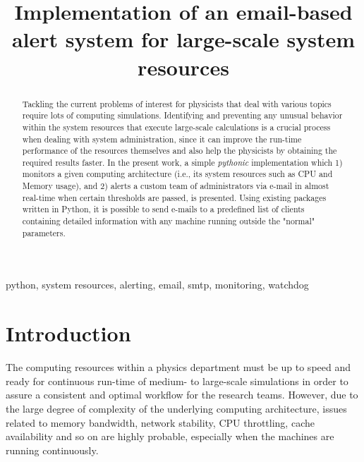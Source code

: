 \documentclass[conference]{IEEEtran}
\begin{document}
\title{Implementation of an email-based alert system for large-scale system resources}

\author{
}

\maketitle

\begin{abstract}
Tackling the current problems of interest for physicists that deal with various topics require lots of computing simulations. Identifying and preventing any unusual behavior within the system resources that execute large-scale calculations is a crucial process when dealing with system administration, since it can improve the run-time performance of the resources themselves and also help the physicists by obtaining the required results faster. In the present work, a simple \emph{pythonic} implementation which 1) monitors a given computing architecture (i.e., its system resources such as CPU and Memory usage), and 2) alerts a custom team of administrators via e-mail in almost real-time when certain thresholds are passed, is presented. Using existing packages written in Python, it is possible to send e-mails to a predefined list of clients containing detailed information with any machine running outside the "normal" parameters.
\end{abstract}

\begin{IEEEkeywords}
python, system resources, alerting, email, smtp, monitoring, watchdog
\end{IEEEkeywords}

\section{Introduction}
The computing resources within a physics department must be up to speed and ready for continuous run-time of medium- to large-scale simulations in order to assure a consistent and optimal workflow for the research teams. However, due to the large degree of complexity of the underlying computing architecture, issues related to memory bandwidth, network stability, CPU throttling, cache availability and so on are highly probable, especially when the machines are running continuously.
\end{document}
